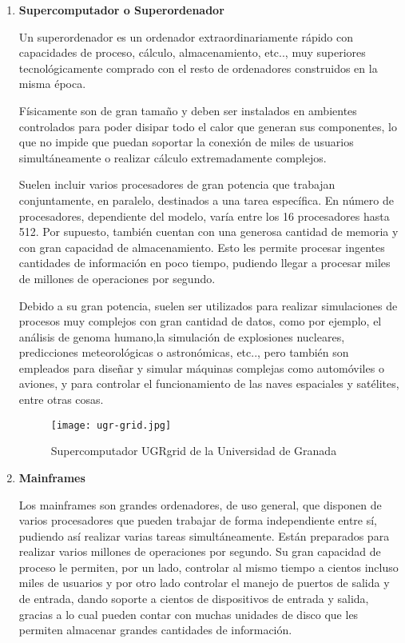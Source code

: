 \begin{enumerate}
    \item \textbf{Supercomputador o Superordenador}

    Un superordenador es un ordenador extraordinariamente rápido con capacidades de proceso, cálculo, almacenamiento, etc.., muy superiores tecnológicamente comprado con el resto de ordenadores construidos en la misma época.

    Físicamente son de gran tamaño y deben ser instalados en ambientes controlados para poder disipar todo el calor que generan sus componentes, lo que no impide que puedan soportar la conexión de miles de usuarios simultáneamente o realizar cálculo extremadamente complejos.

    Suelen incluir varios procesadores de gran potencia que trabajan conjuntamente, en paralelo, destinados a una tarea específica. En número de procesadores, dependiente del modelo, varía entre los 16 procesadores hasta 512. Por supuesto, también cuentan con una generosa cantidad de memoria y con gran capacidad de almacenamiento. Esto les permite procesar ingentes cantidades de información en poco tiempo, pudiendo llegar a procesar miles de millones de operaciones por segundo.

    Debido a su gran potencia, suelen ser utilizados para realizar simulaciones de procesos muy complejos con gran cantidad de datos, como por ejemplo, el análisis de genoma humano,la simulación de explosiones nucleares, predicciones meteorológicas o astronómicas, etc.., pero también son empleados para diseñar y simular máquinas complejas como automóviles o aviones, y para controlar el funcionamiento de las naves espaciales y satélites, entre otras cosas.

    \begin{figure}[ht]
        \centering
        \texttt{[image: ugr-grid.jpg]}
        \caption{Supercomputador UGRgrid de la Universidad de Granada}
    \end{figure}

    \item \textbf{Mainframes}

    Los mainframes son grandes ordenadores, de uso general, que disponen de varios procesadores que pueden trabajar de forma independiente entre sí, pudiendo así realizar varias tareas simultáneamente. Están preparados para realizar varios millones de operaciones por segundo. Su gran capacidad de proceso le permiten, por un lado, controlar al mismo tiempo a cientos incluso miles de usuarios y por otro lado controlar el manejo de puertos de salida y de entrada, dando soporte a cientos de dispositivos de entrada y salida, gracias a lo cual pueden contar con muchas unidades de disco que les permiten almacenar grandes cantidades de información.


\end{enumerate}
